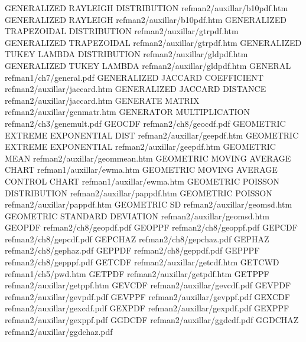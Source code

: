 GENERALIZED RAYLEIGH DISTRIBUTION       refman2/auxillar/b10pdf.htm
GENERALIZED RAYLEIGH                    refman2/auxillar/b10pdf.htm
GENERALIZED TRAPEZOIDAL DISTRIBUTION    refman2/auxillar/gtrpdf.htm
GENERALIZED TRAPEZOIDAL                 refman2/auxillar/gtrpdf.htm
GENERALIZED TUKEY LAMBDA DISTRIBUTION   refman2/auxillar/gldpdf.htm
GENERALIZED TUKEY LAMBDA                refman2/auxillar/gldpdf.htm
GENERAL                                 refman1/ch7/general.pdf
GENERALIZED JACCARD COEFFICIENT         refman2/auxillar/jaccard.htm
GENERALIZED JACCARD DISTANCE            refman2/auxillar/jaccard.htm
GENERATE MATRIX                         refman2/auxillar/genmatr.htm
GENERATOR MULTIPLICATION                refman2/ch3/genemult.pdf
GEOCDF                                  refman2/ch8/geocdf.pdf
GEOMETRIC EXTREME EXPONENTIAL DIST      refman2/auxillar/geepdf.htm
GEOMETRIC EXTREME EXPONENTIAL           refman2/auxillar/geepdf.htm
GEOMETRIC MEAN                          refman2/auxillar/geommean.htm
GEOMETRIC MOVING AVERAGE CHART          refman1/auxillar/ewma.htm
GEOMETRIC MOVING AVERAGE CONTROL CHART  refman1/auxillar/ewma.htm
GEOMETRIC POISSON DISTRIBUTION          refman2/auxillar/pappdf.htm
GEOMETRIC POISSON                       refman2/auxillar/pappdf.htm
GEOMETRIC SD                            refman2/auxillar/geomsd.htm
GEOMETRIC STANDARD DEVIATION            refman2/auxillar/geomsd.htm
GEOPDF                                  refman2/ch8/geopdf.pdf
GEOPPF                                  refman2/ch8/geoppf.pdf
GEPCDF                                  refman2/ch8/gepcdf.pdf
GEPCHAZ                                 refman2/ch8/gepchaz.pdf
GEPHAZ                                  refman2/ch8/gephaz.pdf
GEPPDF                                  refman2/ch8/geppdf.pdf
GEPPPF                                  refman2/ch8/gepppf.pdf
GETCDF                                  refman2/auxillar/getcdf.htm
GETCWD                                  refman1/ch5/pwd.htm
GETPDF                                  refman2/auxillar/getpdf.htm
GETPPF                                  refman2/auxillar/getppf.htm
GEVCDF                                  refman2/auxillar/gevcdf.pdf
GEVPDF                                  refman2/auxillar/gevpdf.pdf
GEVPPF                                  refman2/auxillar/gevppf.pdf
GEXCDF                                  refman2/auxillar/gexcdf.pdf
GEXPDF                                  refman2/auxillar/gexpdf.pdf
GEXPPF                                  refman2/auxillar/gexppf.pdf
GGDCDF                                  refman2/auxillar/ggdcdf.pdf
GGDCHAZ                                 refman2/auxillar/ggdchaz.pdf
